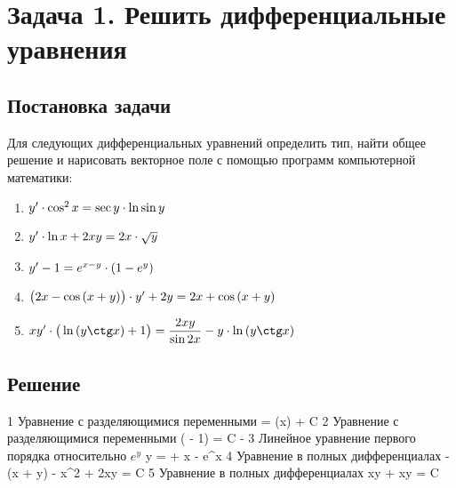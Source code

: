 

\section{Задача 1. Решить дифференциальные уравнения}
\subsection{Постановка задачи}
Для следующих дифференциальных уравнений определить тип, найти общее
решение и нарисовать векторное поле с помощью программ компьютерной математики:

\begin{enumerate}[label={}]
	\item $ {y}' \cdot \cos^{2}{x} = \sec{y} \cdot \ln{\sin{y}} $
	\item $ {y}' \cdot \ln{x} + 2xy = 2x \cdot \sqrt{y} $
	\item $ {y}' - 1 = e^{x-y} \cdot (1 - e^{y}) $    
	\item $ \big(2x - \cos{(x + y)} \big) \cdot {y}' + 2y = 2{x} + \cos{(x + y)} $
	\item $ \equationFifth $
\end{enumerate}

\newpage

\subsection{Решение}
\begin{enumerate}
	\taskOneSolutionItem
		{1}
		{\equationFirst}
		{Уравнение с разделяющимися переменными}
		{ = \tan(x) + {C}}
	\taskOneSolutionItem
		{2}
		{\equationSecond}
		{Уравнение с разделяющимися переменными}
		{\ln( - 1) = C - }
	\taskOneSolutionItem
		{3}
		{\equationThird}
		{Линейное уравнение первого порядка относительно $ e^y $}
		{y =  + {x} - e^{x}}
	\taskOneSolutionItem
		{4}
		{\equationFourth}
		{Уравнение в полных дифференциалах}
		{-\sin(x + y) - {x}^2 + 2xy = C}
	\taskOneSolutionItem
		{5}
		{\equationFifth}
		{Уравнение в полных дифференциалах}
		{xy + xy = C}
\end{enumerate}
